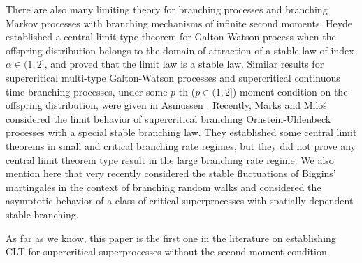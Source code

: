 \documentclass[12pt,a4paper]{amsart}
\theoremstyle{plain}
\theoremstyle{definition}
\numberwithin{equation}{section}
\begin{document}
    There are also many limiting theory for branching processes and branching Markov processes with branching mechanisms of infinite second moments.
    Heyde \cite{Heyde1971Some} established a central limit type  theorem for Galton-Watson process 
when the offspring distribution
    belongs to the domain of attraction of a stable law of index $\alpha\in (1, 2]$,
    and   proved that the limit law is  a stable law. Similar results  for supercritical multi-type Galton-Watson processes and supercritical  continuous time branching processes,  
under some $p$-th ($p\in(1,2]$) moment condition on the offspring distribution,
    were given in Asmussen \cite{Asmussen76Convergence}.
    Recently,   Marks and Milo\'s \cite{MarksMilos2018CLT}
    considered the limit behavior of supercritical branching Ornstein-Uhlenbeck processes with a special stable branching law. 
    They established some central limit theorems in small and critical branching rate regimes, but they did not prove any central limit theorem type result in the large branching rate regime.
    We also mention here that very recently \cite{IksanovKoleskoMeiners2018Stable-like} considered the stable fluctuations of Biggins' martingales in the context of branching random walks and \cite{RenSongSun2018Limit} considered the asymptotic behavior of a class of critical superprocesses with spatially dependent stable branching.

    As far as we know, this paper is the first one in the literature on establishing CLT for supercritical superprocesses without the second moment condition.
\end{document}
